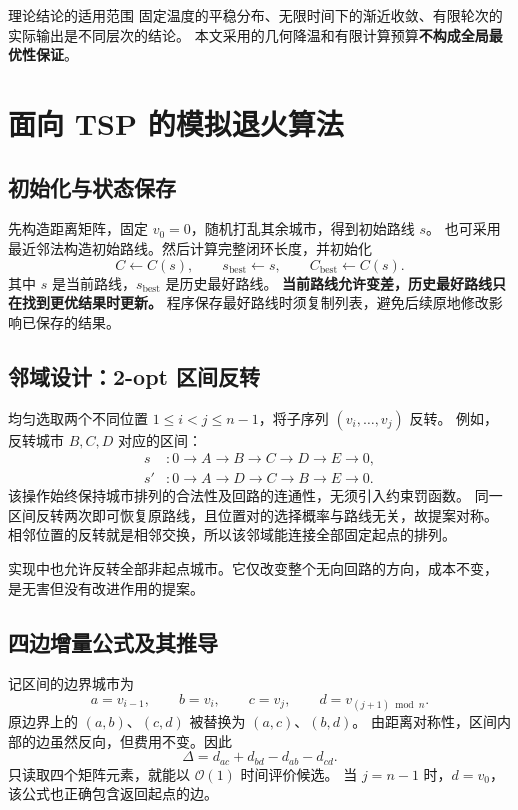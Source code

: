 \documentclass[UTF8,a4paper,11pt,fontset=none]{ctexart}
\numberwithin{equation}{section}
\newcommand{\best}{\mathrm{best}}
\newcommand{\bigO}{\mathcal{O}}
\begin{document}
\begin{keypoint}{理论结论的适用范围}
固定温度的平稳分布、无限时间下的渐近收敛、有限轮次的实际输出是不同层次的结论。
本文采用的几何降温和有限计算预算\textbf{不构成全局最优性保证}。
\end{keypoint}

\section{面向 TSP 的模拟退火算法}
\subsection{初始化与状态保存}
先构造距离矩阵，固定 $v_0=0$，随机打乱其余城市，得到初始路线 $s$。
也可采用最近邻法构造初始路线。然后计算完整闭环长度，并初始化
\begin{equation}
  C\gets C(s),\qquad s_{\best}\gets s,\qquad C_{\best}\gets C(s).
\end{equation}
其中 $s$ 是当前路线，$s_{\best}$ 是历史最好路线。
\textbf{当前路线允许变差，历史最好路线只在找到更优结果时更新。}
程序保存最好路线时须复制列表，避免后续原地修改影响已保存的结果。

\subsection{邻域设计：2-opt 区间反转}
均匀选取两个不同位置 $1\leq i<j\leq n-1$，将子序列 $(v_i,\ldots,v_j)$ 反转。
例如，反转城市 $B,C,D$ 对应的区间：
\begin{equation*}
  \begin{aligned}
    s &: 0\to A\to B\to C\to D\to E\to0,\\
    s'&: 0\to A\to D\to C\to B\to E\to0.
  \end{aligned}
\end{equation*}
该操作始终保持城市排列的合法性及回路的连通性，无须引入约束罚函数。
同一区间反转两次即可恢复原路线，且位置对的选择概率与路线无关，故提案对称。
相邻位置的反转就是相邻交换，所以该邻域能连接全部固定起点的排列。

实现中也允许反转全部非起点城市。它仅改变整个无向回路的方向，成本不变，
是无害但没有改进作用的提案。

\subsection{四边增量公式及其推导}
记区间的边界城市为
\begin{equation}
  a=v_{i-1},\qquad b=v_i,\qquad c=v_j,\qquad
  d=v_{(j+1)\bmod n}.
\end{equation}
原边界上的 $(a,b)$、$(c,d)$ 被替换为 $(a,c)$、$(b,d)$。
由距离对称性，区间内部的边虽然反向，但费用不变。因此
\begin{equation}
  \boxed{\Delta=d_{ac}+d_{bd}-d_{ab}-d_{cd}.}
  \label{eq:twoopt}
\end{equation}
只读取四个矩阵元素，就能以 $\bigO(1)$ 时间评价候选。
当 $j=n-1$ 时，$d=v_0$，该公式也正确包含返回起点的边。
\end{document}
